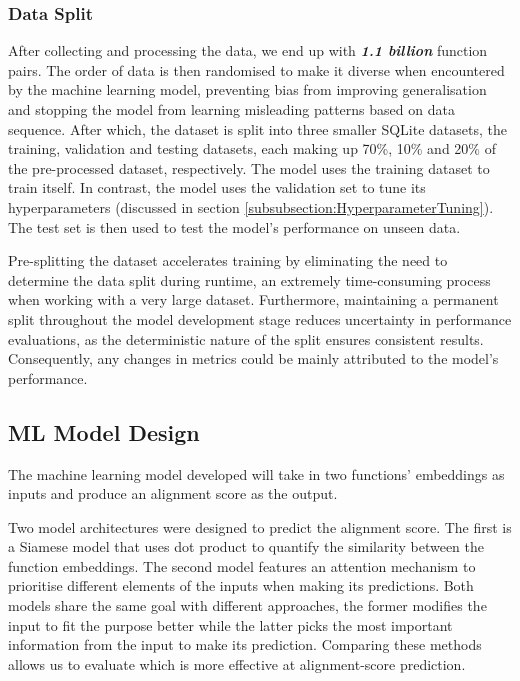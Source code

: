 \subsubsection{Data Split} \label{Design:DataSplit}
After collecting and processing the data, we end up with \textbf{\textit{1.1 billion}} function pairs. The order of data is then randomised to make it diverse when encountered by the machine learning model, preventing bias from improving generalisation and stopping the model from learning misleading patterns based on data sequence. After which, the dataset is split into three smaller SQLite datasets, the training, validation and testing datasets, each making up 70\%, 10\% and 20\% of the pre-processed dataset, respectively. The model uses the training dataset to train itself. In contrast, the model uses the validation set to tune its hyperparameters (discussed in section \ref{subsubsection:HyperparameterTuning}). The test set is then used to test the model's performance on unseen data.

Pre-splitting the dataset accelerates training by eliminating the need to determine the data split during runtime, an extremely time-consuming process when working with a very large dataset. Furthermore, maintaining a permanent split throughout the model development stage reduces uncertainty in performance evaluations, as the deterministic nature of the split ensures consistent results. Consequently, any changes in metrics could be mainly attributed to the model's performance.

\subsection{ML Model Design}
The machine learning model developed will take in two functions' embeddings as inputs and produce an alignment score as the output.


Two model architectures were designed to predict the alignment score. The first is a Siamese model that uses dot product to quantify the similarity between the function embeddings. The second model features an attention mechanism to prioritise different elements of the inputs when making its predictions. Both models share the same goal with different approaches, the former modifies the input to fit the purpose better while the latter picks the most important information from the input to make its prediction. Comparing these methods allows us to evaluate which is more effective at alignment-score prediction.

